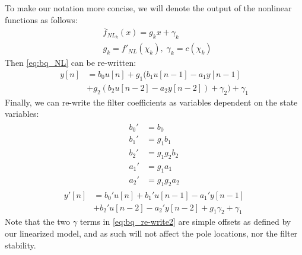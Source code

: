 \documentclass[twoside,a4paper]{article}
\begin{document}
To make our notation more concise, we will denote the
output of the nonlinear functions as follows:
\begin{equation}
\begin{split}
    & \bar{f}_{NL_k}(x) = g_k x + \gamma_k \\
    & g_k = f'_{NL}(\chi_k), \; \gamma_k = c(\chi_k)
\end{split}
    \label{eq:linearized_bqnls}
\end{equation}
Then \cref{eq:bq_NL} can be re-written:
%
\begin{equation}
\begin{split}
    y[n] &= b_0 u[n]
         + g_1 (b_1 u[n-1] - a_1 y[n-1] \\
         &+ g_2 (b_2 u[n-2] - a_2 y[n-2]) + \gamma_2) + \gamma_1
\end{split}
    \label{eq:bq_re-write}
\end{equation}
%
Finally, we can re-write the filter coefficients as variables dependent on
the state variables:
%
\begin{align}
\begin{split}
    b_0' &= b_0\\
    b_1' &= g_1 b_1\\
    b_2' &= g_1g_2 b_2\\
    a_1' &= g_1 a_1\\
    a_2' &= g_1g_2 a_2
\end{split}
    \label{eq:bq_coefs_re-write}
\end{align}
%
\begin{equation}
\begin{split}
    y'[n] &= b_0' u[n]
    + b_1' u[n-1] - a_1' y[n-1] \\
    & + b_2' u[n-2] - a_2' y[n-2]
    + g_1\gamma_2 + \gamma_1
\end{split}
    \label{eq:bq_re-write2}
\end{equation}
%
Note that the two $\gamma$ terms in \cref{eq:bq_re-write2} are simple
offsets as defined by our linearized model, and as such will not
affect the pole locations, nor the filter stability.
\end{document}
